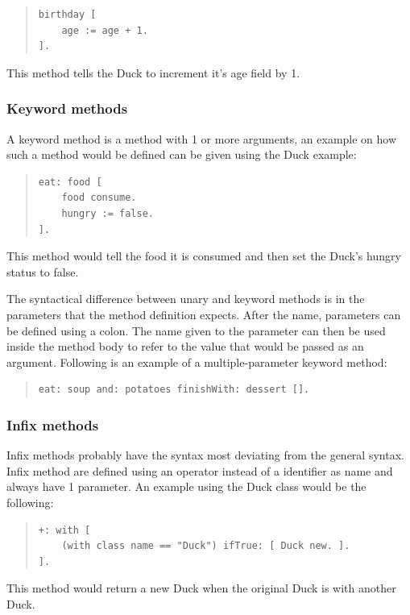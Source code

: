 \documentclass[a4paper]{article}
\begin{document}
\begin{quote}
\begin{lstlisting}
birthday [
	age := age + 1.
].
\end{lstlisting}
\end{quote}
This method tells the Duck to increment it's age field by 1.

\subsubsection{Keyword methods}
A keyword method is a method with 1 or more arguments, an example on how such a method would be defined can be given using the Duck example:

\begin{quote}
\begin{lstlisting}
eat: food [
	food consume.
	hungry := false.
].
\end{lstlisting}
\end{quote}
This method would tell the food it is consumed and then set the Duck's hungry status to false.

The syntactical difference between unary and keyword methods is in the parameters that the method definition expects. After the name, parameters can be defined using a colon. The name given to the parameter can then be used inside the method body to refer to the value that would be passed as an argument. Following is an example of a multiple-parameter keyword method:

\begin{quote}
\begin{lstlisting}
eat: soup and: potatoes finishWith: dessert [].
\end{lstlisting}
\end{quote}

\subsubsection{Infix methods}

Infix methods probably have the syntax most deviating from the general syntax. Infix method are defined using an operator instead of a identifier as name and always have 1 parameter. An example using the Duck class would be the following:

\begin{quote}
\begin{lstlisting}
+: with [
	(with class name == "Duck") ifTrue: [ Duck new. ].
].
\end{lstlisting}
\end{quote}
This method would return a new Duck when the original Duck is with another Duck.
\end{document}
